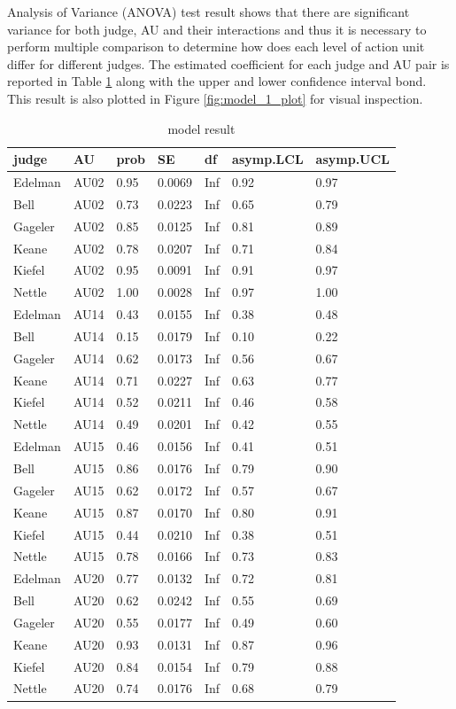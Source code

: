 \documentclass{monashthesis}
\begin{document}
Analysis of Variance (ANOVA) test result shows that there are significant variance for both judge, AU and their interactions and thus it is necessary to perform multiple comparison to determine how does each level of action unit differ for different judges. The estimated coefficient for each judge and AU pair is reported in Table \ref{tab:result_1} along with the upper and lower confidence interval bond. This result is also plotted in Figure \ref{fig:model_1_plot} for visual inspection.

\begin{table}[ht]
\begin{center}
\caption{\label{tab:result_1} model result}
\begin{tabular}{lllllll}
\toprule
judge & AU & prob & SE & df & asymp.LCL & asymp.UCL \\
\midrule
Edelman & AU02 & 0.95 & 0.0069 & Inf & 0.92 & 0.97 \\
Bell & AU02 & 0.73 & 0.0223 & Inf & 0.65 & 0.79 \\
Gageler & AU02 & 0.85 & 0.0125 & Inf & 0.81 & 0.89 \\
Keane & AU02 & 0.78 & 0.0207 & Inf & 0.71 & 0.84 \\
Kiefel & AU02 & 0.95 & 0.0091 & Inf & 0.91 & 0.97 \\
Nettle & AU02 & 1.00 & 0.0028 & Inf & 0.97 & 1.00 \\
Edelman & AU14 & 0.43 & 0.0155 & Inf & 0.38 & 0.48 \\
Bell & AU14 & 0.15 & 0.0179 & Inf & 0.10 & 0.22 \\
Gageler & AU14 & 0.62 & 0.0173 & Inf & 0.56 & 0.67 \\
Keane & AU14 & 0.71 & 0.0227 & Inf & 0.63 & 0.77 \\
Kiefel & AU14 & 0.52 & 0.0211 & Inf & 0.46 & 0.58 \\
Nettle & AU14 & 0.49 & 0.0201 & Inf & 0.42 & 0.55 \\
Edelman & AU15 & 0.46 & 0.0156 & Inf & 0.41 & 0.51 \\
Bell & AU15 & 0.86 & 0.0176 & Inf & 0.79 & 0.90 \\
Gageler & AU15 & 0.62 & 0.0172 & Inf & 0.57 & 0.67 \\
Keane & AU15 & 0.87 & 0.0170 & Inf & 0.80 & 0.91 \\
Kiefel & AU15 & 0.44 & 0.0210 & Inf & 0.38 & 0.51 \\
Nettle & AU15 & 0.78 & 0.0166 & Inf & 0.73 & 0.83 \\
Edelman & AU20 & 0.77 & 0.0132 & Inf & 0.72 & 0.81 \\
Bell & AU20 & 0.62 & 0.0242 & Inf & 0.55 & 0.69 \\
Gageler & AU20 & 0.55 & 0.0177 & Inf & 0.49 & 0.60 \\
Keane & AU20 & 0.93 & 0.0131 & Inf & 0.87 & 0.96 \\
Kiefel & AU20 & 0.84 & 0.0154 & Inf & 0.79 & 0.88 \\
Nettle & AU20 & 0.74 & 0.0176 & Inf & 0.68 & 0.79 \\
\bottomrule
\end{tabular}
\end{center}
\end{table}
\end{document}
